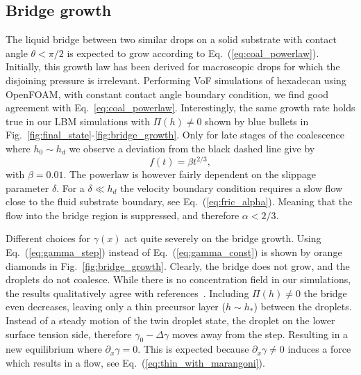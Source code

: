 \documentclass[twocolumn,amsmath,amssymb,showpacs,pre,nofootinbib,superscriptaddress]{revtex4-1} %
\begin{document}
\subsection{Bridge growth}\label{subsec:growth}
The liquid bridge between two similar drops on a solid substrate with contact angle $\theta < \pi/2$ is expected to grow according to Eq.~(\ref{eq:coal_powerlaw}). 
Initially, this growth law has been derived for macroscopic drops for which the disjoining pressure is irrelevant.
Performing VoF simulations of hexadecan using OpenFOAM, with constant contact angle boundary condition, we find good agreement with Eq.~\ref{eq:coal_powerlaw}.
Interestingly, the same growth rate holds true in our LBM simulations with $\Pi(h) \neq 0$ shown by blue bullets in Fig.~\ref{fig:final_state}-\ref{fig:bridge_growth}.
Only for late stages of the coalescence where $h_0 \sim h_d$ we observe a deviation from the black dashed line give by
\begin{equation}\label{eq:fit_powerlaw}
    f(t) = \beta t^{2/3},
\end{equation}
with $\beta = 0.01$.
The powerlaw is however fairly dependent on the slippage parameter $\delta$. 
For a $\delta \ll h_d$ the velocity boundary condition requires a slow flow close to the fluid substrate boundary, see Eq.~(\ref{eq:fric_alpha}). 
Meaning that the flow into the bridge region is suppressed, and therefore $\alpha < 2/3$.
 
Different choices for $\gamma(x)$ act quite severely on the bridge growth.
Using Eq.~(\ref{eq:gamma_step}) instead of Eq.~(\ref{eq:gamma_const}) is shown by orange diamonds in Fig.~\ref{fig:bridge_growth}.
Clearly, the bridge does not grow, and the droplets do not coalesce.
While there is no concentration field in our simulations, the results qualitatively agree with references~\cite{karpitschka2014sharp, doi:10.1021/la500459v, PhysRevLett.109.066103, doi:10.1021/la800630w}. 
Including $\Pi(h) \neq 0$ the bridge even decreases, leaving only a thin precursor layer ($h\sim h_{\ast}$) between the droplets.
Instead of a steady motion of the twin droplet state, the droplet on the lower surface tension side, therefore $\gamma_0 - \Delta\gamma$ moves away from the step. 
Resulting in a new equilibrium where $\partial_x\gamma = 0$.
This is expected because $\partial_x\gamma\neq 0$ induces a force which results in a flow, see Eq.~(\ref{eq:thin_with_marangoni}).
\end{document}
